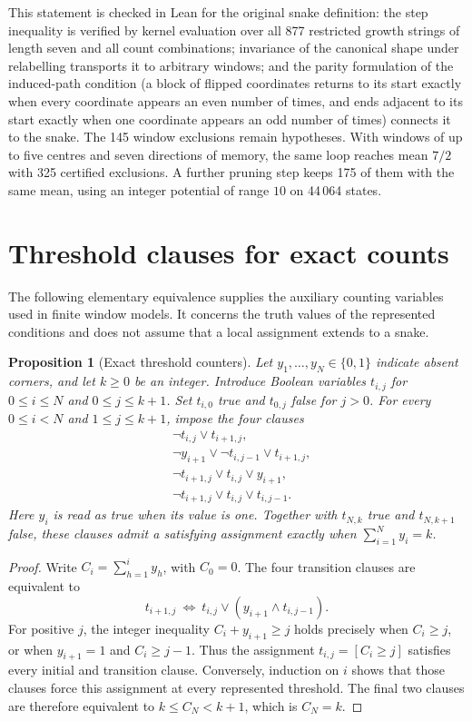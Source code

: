 \documentclass[11pt,a4paper]{article}
\newtheorem{proposition}[theorem]{Proposition}
\theoremstyle{definition}
\theoremstyle{remark}
\begin{document}
This statement is checked in Lean for the original snake definition: the step inequality is verified by kernel evaluation over all 877 restricted growth strings of length seven and all count combinations; invariance of the canonical shape under relabelling transports it to arbitrary windows; and the parity formulation of the induced-path condition (a block of flipped coordinates returns to its start exactly when every coordinate appears an even number of times, and ends adjacent to its start exactly when one coordinate appears an odd number of times) connects it to the snake. The 145 window exclusions remain hypotheses. With windows of up to five centres and seven directions of memory, the same loop reaches mean $7/2$ with 325 certified exclusions. A further pruning step keeps 175 of them with the same mean, using an integer potential of range $10$ on 44\,064 states.

\section{Threshold clauses for exact counts}\label{app:counters}
The following elementary equivalence supplies the auxiliary counting variables used in finite window models. It concerns the truth values of the represented conditions and does not assume that a local assignment extends to a snake.

\begin{proposition}[Exact threshold counters]\label{prop:window-counter}
Let $y_1,\ldots,y_N\in\{0,1\}$ indicate absent corners, and let $k\ge0$ be an integer. Introduce Boolean variables $t_{i,j}$ for $0\le i\le N$ and $0\le j\le k+1$. Set $t_{i,0}$ true and $t_{0,j}$ false for $j>0$. For every $0\le i<N$ and $1\le j\le k+1$, impose the four clauses
\[
\begin{aligned}
&\neg t_{i,j}\lor t_{i+1,j},\\
&\neg y_{i+1}\lor\neg t_{i,j-1}\lor t_{i+1,j},\\
&\neg t_{i+1,j}\lor t_{i,j}\lor y_{i+1},\\
&\neg t_{i+1,j}\lor t_{i,j}\lor t_{i,j-1}.
\end{aligned}
\]
Here $y_i$ is read as true when its value is one. Together with $t_{N,k}$ true and $t_{N,k+1}$ false, these clauses admit a satisfying assignment exactly when $\sum_{i=1}^N y_i=k$.
\end{proposition}
\begin{proof}
Write $C_i=\sum_{h=1}^i y_h$, with $C_0=0$. The four transition clauses are equivalent to
\[
t_{i+1,j}\ \Longleftrightarrow\ t_{i,j}\lor(y_{i+1}\land t_{i,j-1}).
\]
For positive $j$, the integer inequality $C_i+y_{i+1}\ge j$ holds precisely when $C_i\ge j$, or when $y_{i+1}=1$ and $C_i\ge j-1$. Thus the assignment $t_{i,j}=[C_i\ge j]$ satisfies every initial and transition clause. Conversely, induction on $i$ shows that those clauses force this assignment at every represented threshold. The final two clauses are therefore equivalent to $k\le C_N<k+1$, which is $C_N=k$.
\end{proof}
\end{document}
